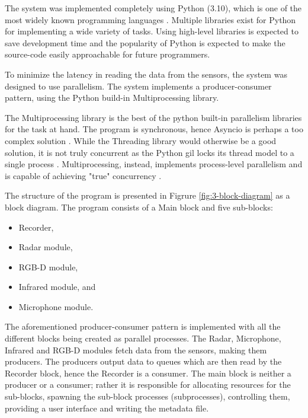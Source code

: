 The system was implemented completely using Python (3.10),
which is one of the most widely known programming languages \cite{developer-survey}.
Multiple libraries exist for Python for implementing a wide variety of tasks.
Using high-level libraries is expected to save development time and the popularity of Python
is expected to make the source-code easily approachable for future programmers.

To minimize the latency in reading the data from the sensors,
the system was designed to use parallelism.
The system implements a producer-consumer pattern,
using the Python build-in Multiprocessing library.

The Multiprocessing library is the best of the python built-in parallelism libraries for the task at hand.
The program is synchronous, hence Asyncio is perhaps a too complex solution \cite{python-asyncio}.
While the Threading library would otherwise be a good solution,
it is not truly concurrent as the Python \gls{gil} locks its thread model to a single process \cite{python-threading}.
Multiprocessing, instead, implements process-level parallelism and is capable of achieving "true" concurrency \cite{python-multiprocessing}.

The structure of the program is presented in Figrure \ref{fig:3-block-diagram} as a block diagram.
The program consists of a Main block and five sub-blocks:
\begin{itemize}
    \item Recorder,
    \item Radar module,
    \item RGB-D module,
    \item Infrared module, and
    \item Microphone module.
\end{itemize}

The aforementioned producer-consumer pattern is implemented with all the different blocks being created as parallel processes.
The Radar, Microphone, Infrared and RGB-D modules fetch data from the sensors, making them producers.
The producers output data to queues which are then read by the Recorder block,
hence the Recorder is a consumer.
The main block is neither a producer or a consumer; rather it is responsible for allocating resources for the sub-blocks,
spawning the sub-block processes (subprocesses), controlling them, providing a user interface and writing the metadata file.

